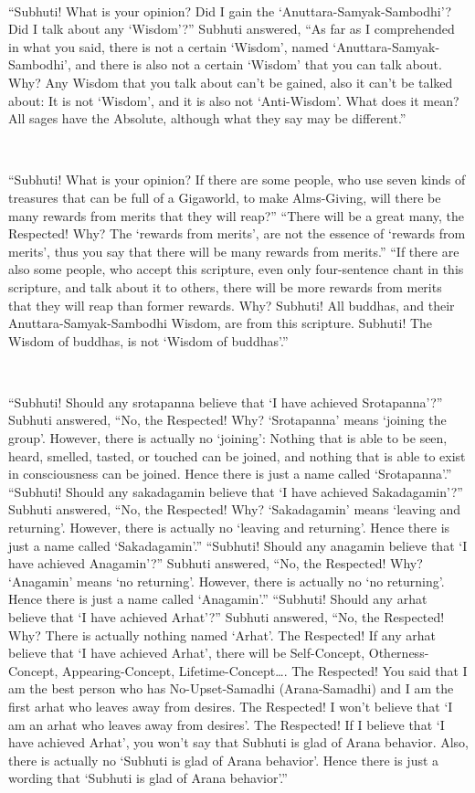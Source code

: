 \documentclass[a5paper,12pt]{book}
\begin{document}
    ~

     ``Subhuti! What is your opinion? Did I gain the `Anuttara-Samyak-Sambodhi'? Did I talk about any `Wisdom'?'' Subhuti answered, ``As far as I comprehended in what you said, there is not a certain `Wisdom', named `Anuttara-Samyak-Sambodhi', and there is also not a certain `Wisdom' that you can talk about. Why? Any Wisdom that you talk about can't be gained, also it can't be talked about: It is not `Wisdom', and it is also not `Anti-Wisdom'. What does it mean? All sages have the Absolute, although what they say may be different.''

    ~

     ``Subhuti! What is your opinion? If there are some people, who use seven kinds of treasures that can be full of a Gigaworld, to make Alms-Giving, will there be many rewards from merits that they will reap?'' ``There will be a great many, the Respected! Why? The `rewards from merits', are not the essence of `rewards from merits', thus you say that there will be many rewards from merits.'' ``If there are also some people, who accept this scripture, even only four-sentence chant in this scripture, and talk about it to others, there will be more rewards from merits that they will reap than former rewards. Why? Subhuti! All buddhas, and their Anuttara-Samyak-Sambodhi Wisdom, are from this scripture. Subhuti! The Wisdom of buddhas, is not `Wisdom of buddhas'.''

    ~

     ``Subhuti! Should any srotapanna believe that `I have achieved Srotapanna'?'' Subhuti answered, ``No, the Respected! Why? `Srotapanna' means `joining the group'. However, there is actually no `joining': Nothing that is able to be seen, heard, smelled, tasted, or touched can be joined, and nothing that is able to exist in consciousness can be joined. Hence there is just a name called `Srotapanna'.'' ``Subhuti! Should any sakadagamin believe that `I have achieved Sakadagamin'?'' Subhuti answered, ``No, the Respected! Why? `Sakadagamin' means `leaving and returning'. However, there is actually no `leaving and returning'. Hence there is just a name called `Sakadagamin'.'' ``Subhuti! Should any anagamin believe that `I have achieved Anagamin'?'' Subhuti answered, ``No, the Respected! Why? `Anagamin' means `no returning'. However, there is actually no `no returning'. Hence there is just a name called `Anagamin'.'' ``Subhuti! Should any arhat believe that `I have achieved Arhat'?'' Subhuti answered, ``No, the Respected! Why? There is actually nothing named `Arhat'. The Respected! If any arhat believe that `I have achieved Arhat', there will be Self-Concept, Otherness-Concept, Appearing-Concept, Lifetime-Concept\dots{}. The Respected! You said that I am the best person who has No-Upset-Samadhi (Arana-Samadhi) and I am the first arhat who leaves away from desires. The Respected! I won't believe that `I am an arhat who leaves away from desires'. The Respected! If I believe that `I have achieved Arhat', you won't say that Subhuti is glad of Arana behavior. Also, there is actually no `Subhuti is glad of Arana behavior'. Hence there is just a wording that `Subhuti is glad of Arana behavior'.''
\end{document}

